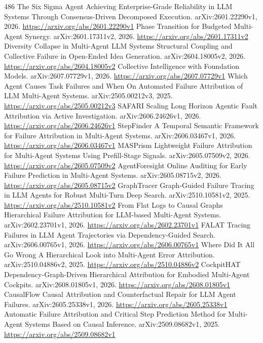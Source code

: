 \documentclass[11pt]{article}
\begin{document}
\begin{thebibliography}{486}
 The Six Sigma Agent Achieving Enterprise-Grade Reliability in LLM Systems Through Consensus-Driven Decomposed Execution. arXiv:2601.22290v1, 2026. \url{https://arxiv.org/abs/2601.22290v1}
 Phase Transition for Budgeted Multi-Agent Synergy. arXiv:2601.17311v2, 2026. \url{https://arxiv.org/abs/2601.17311v2}
 Diversity Collapse in Multi-Agent LLM Systems Structural Coupling and Collective Failure in Open-Ended Idea Generation. arXiv:2604.18005v2, 2026. \url{https://arxiv.org/abs/2604.18005v2}
 Collective Intelligence with Foundation Models. arXiv:2607.07729v1, 2026. \url{https://arxiv.org/abs/2607.07729v1}
 Which Agent Causes Task Failures and When On Automated Failure Attribution of LLM Multi-Agent Systems. arXiv:2505.00212v3, 2025. \url{https://arxiv.org/abs/2505.00212v3}
 SAFARI Scaling Long Horizon Agentic Fault Attribution via Active Investigation. arXiv:2606.24626v1, 2026. \url{https://arxiv.org/abs/2606.24626v1}
 StepFinder A Temporal Semantic Framework for Failure Attribution in Multi-Agent Systems. arXiv:2606.03467v1, 2026. \url{https://arxiv.org/abs/2606.03467v1}
 MASPrism Lightweight Failure Attribution for Multi-Agent Systems Using Prefill-Stage Signals. arXiv:2605.07509v2, 2026. \url{https://arxiv.org/abs/2605.07509v2}
 AgentForesight Online Auditing for Early Failure Prediction in Multi-Agent Systems. arXiv:2605.08715v2, 2026. \url{https://arxiv.org/abs/2605.08715v2}
 GraphTracer Graph-Guided Failure Tracing in LLM Agents for Robust Multi-Turn Deep Search. arXiv:2510.10581v2, 2025. \url{https://arxiv.org/abs/2510.10581v2}
 From Flat Logs to Causal Graphs Hierarchical Failure Attribution for LLM-based Multi-Agent Systems. arXiv:2602.23701v1, 2026. \url{https://arxiv.org/abs/2602.23701v1}
 FALAT Tracing Failures in LLM Agent Trajectories via Dependency-Guided Search. arXiv:2606.00765v1, 2026. \url{https://arxiv.org/abs/2606.00765v1}
 Where Did It All Go Wrong A Hierarchical Look into Multi-Agent Error Attribution. arXiv:2510.04886v2, 2025. \url{https://arxiv.org/abs/2510.04886v2}
 CockpitHAT Dependency-Graph-Driven Hierarchical Attribution for Embodied Multi-Agent Cockpits. arXiv:2608.01805v1, 2026. \url{https://arxiv.org/abs/2608.01805v1}
 CausalFlow Causal Attribution and Counterfactual Repair for LLM Agent Failures. arXiv:2605.25338v1, 2026. \url{https://arxiv.org/abs/2605.25338v1}
 Automatic Failure Attribution and Critical Step Prediction Method for Multi-Agent Systems Based on Causal Inference. arXiv:2509.08682v1, 2025. \url{https://arxiv.org/abs/2509.08682v1}

\end{thebibliography}
\end{document}
